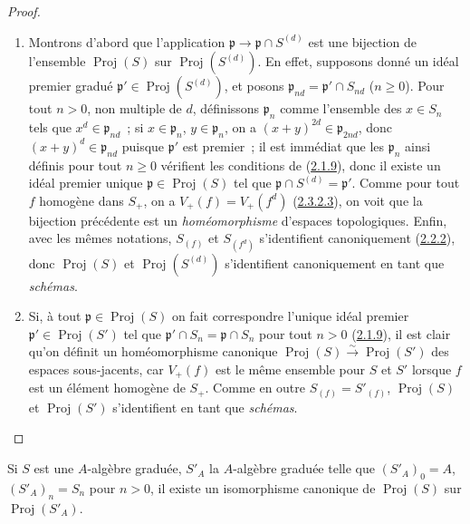 \begin{proof}
\begin{enumerate}
  \item[\rm(i)] Montrons d'abord que l'application
    $\mathfrak{p}\to\mathfrak{p}\cap S^{(d)}$ est une bijection de
    l'ensemble $\operatorname{Proj}(S)$ sur
    $\operatorname{Proj}(S^{(d)})$. En effet, supposons donné un idéal
    premier gradué $\mathfrak{p}'\in\operatorname{Proj}(S^{(d)})$, et posons
    $\mathfrak{p}_{nd}=\mathfrak{p}'\cap S_{nd}$ ($n\geq0$). Pour tout
    $n>0$, non multiple de $d$, définissons $\mathfrak{p}_n$ comme
    l'ensemble des $x\in S_n$ tels que
    $x^d\in\mathfrak{p}_{nd}$~; si $x\in\mathfrak{p}_n$,
    $y\in\mathfrak{p}_n$, on a
    $(x+y)^{2d}\in\mathfrak{p}_{2nd}$, donc
    $(x+y)^d\in\mathfrak{p}_{nd}$ puisque $\mathfrak{p}'$ est premier~; il
    est immédiat que les $\mathfrak{p}_n$ ainsi définis pour tout $n\geq0$
    vérifient les conditions de
    (\hyperref[II.2.1.9-fr]{2.1.9}), donc il existe un idéal premier unique
    $\mathfrak{p}\in\operatorname{Proj}(S)$ tel que
    $\mathfrak{p}\cap S^{(d)}=\mathfrak{p}'$. Comme pour tout $f$ homogène
    dans $S_+$, on a
    $V_+(f)=V_+(f^d)$ (\hyperref[II.2.3.2.3-fr]{2.3.2.3}), on voit que la
    bijection précédente est un \emph{homéomorphisme} d'espaces topologiques.
    Enfin, avec les mêmes notations, $S_{(f)}$ et
    $S_{(f^d)}$ s'identifient canoniquement
    (\hyperref[II.2.2.2-fr]{2.2.2}), donc $\operatorname{Proj}(S)$ et
    $\operatorname{Proj}(S^{(d)})$ s'identifient canoniquement en tant que
    \emph{schémas}.
  \item[\rm(ii)] Si, à tout
    $\mathfrak{p}\in\operatorname{Proj}(S)$ on fait correspondre l'unique
    idéal premier $\mathfrak{p}'\in\operatorname{Proj}(S')$ tel que
    $\mathfrak{p}'\cap S_n=\mathfrak{p}\cap S_n$ pour tout $n>0$
    (\hyperref[II.2.1.9-fr]{2.1.9}), il est clair qu'on définit un
    homéomorphisme canonique
    $\operatorname{Proj}(S)\xrightarrow{\sim}\operatorname{Proj}(S')$ des
    espaces sous-jacents, car $V_+(f)$ est le même ensemble pour $S$ et
    $S'$ lorsque $f$ est un élément homogène de $S_+$. Comme en outre
    $S_{(f)}=S'_{(f)}$, $\operatorname{Proj}(S)$ et
    $\operatorname{Proj}(S')$ s'identifient en tant que \emph{schémas}.
\end{enumerate}
\end{proof}

\begin{corollary}[2.4.8]
\label{II.2.4.8-fr}
Si $S$ est une $A$-algèbre graduée, $S'_A$ la $A$-algèbre graduée telle que
$(S'_A)_0=A$, $(S'_A)_n=S_n$ pour $n>0$, il existe un isomorphisme canonique
de $\operatorname{Proj}(S)$ sur $\operatorname{Proj}(S'_A)$.
\end{corollary}

